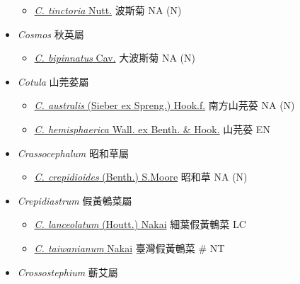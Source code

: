 \begin{itemize}
  \begin{itemize}
        \item[] \href{http://www.theplantlist.org/tpl1.1/search?q=Coreopsis+tinctoria}{\textit{C. tinctoria} Nutt.}   波斯菊   NA (N)
  \end{itemize}
 \item[] \textit{Cosmos} 秋英屬
                                
  \begin{itemize}
        \item[] \href{http://www.theplantlist.org/tpl1.1/search?q=Cosmos+bipinnatus}{\textit{C. bipinnatus} Cav.}   大波斯菊   NA (N)
  \end{itemize}
 \item[] \textit{Cotula} 山莞荽屬
                                
  \begin{itemize}
        \item[] \href{http://www.theplantlist.org/tpl1.1/search?q=Cotula+australis}{\textit{C. australis} (Sieber ex Spreng.) Hook.f.}   南方山芫荽   NA (N)
        \item[] \href{http://www.theplantlist.org/tpl1.1/search?q=Cotula+hemisphaerica}{\textit{C. hemisphaerica} Wall. ex Benth. \& Hook.}   山芫荽   EN
  \end{itemize}
 \item[] \textit{Crassocephalum} 昭和草屬
                                
  \begin{itemize}
        \item[] \href{http://www.theplantlist.org/tpl1.1/search?q=Crassocephalum+crepidioides}{\textit{C. crepidioides} (Benth.) S.Moore}   昭和草   NA (N)
  \end{itemize}
 \item[] \textit{Crepidiastrum} 假黃鵪菜屬
                                
  \begin{itemize}
        \item[] \href{http://www.theplantlist.org/tpl1.1/search?q=Crepidiastrum+lanceolatum}{\textit{C. lanceolatum} (Houtt.) Nakai}   細葉假黃鵪菜   LC
        \item[] \href{http://www.theplantlist.org/tpl1.1/search?q=Crepidiastrum+taiwanianum}{\textit{C. taiwanianum} Nakai}   臺灣假黃鵪菜  \# NT
  \end{itemize}
 \item[] \textit{Crossostephium} 蘄艾屬
                                

\end{itemize}
